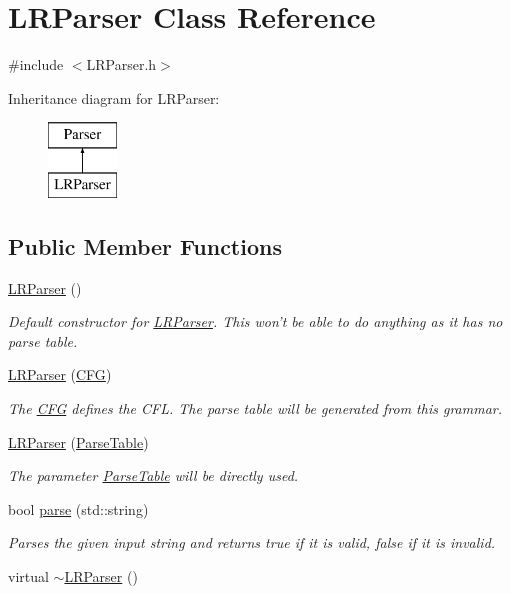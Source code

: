 \hypertarget{classLRParser}{\section{\-L\-R\-Parser \-Class \-Reference}
\label{d6/de9/classLRParser}
}


{\ttfamily \#include $<$\-L\-R\-Parser.\-h$>$}

\-Inheritance diagram for \-L\-R\-Parser\-:\begin{figure}[H]
\begin{center}
\leavevmode
\includegraphics[height=2.000000cm]{d6/de9/classLRParser}
\end{center}
\end{figure}
\subsection*{\-Public \-Member \-Functions}
\begin{DoxyCompactItemize}
\item 
\hyperlink{classLRParser_adf2fe54095f02900d06389007a1e5f53}{\-L\-R\-Parser} ()
\begin{DoxyCompactList}\small\item\em \-Default constructor for \hyperlink{classLRParser}{\-L\-R\-Parser}. \-This won't be able to do anything as it has no parse table. \end{DoxyCompactList}\item 
\hyperlink{classLRParser_abee4e9919e49f66051167487fb467601}{\-L\-R\-Parser} (\hyperlink{classCFG}{\-C\-F\-G})
\begin{DoxyCompactList}\small\item\em \-The \hyperlink{classCFG}{\-C\-F\-G} defines the \-C\-F\-L. \-The parse table will be generated from this grammar. \end{DoxyCompactList}\item 
\hyperlink{classLRParser_a52727298bd32f6b4ac91d2e1351ffe49}{\-L\-R\-Parser} (\hyperlink{classParseTable}{\-Parse\-Table})
\begin{DoxyCompactList}\small\item\em \-The parameter \hyperlink{classParseTable}{\-Parse\-Table} will be directly used. \end{DoxyCompactList}\item 
bool \hyperlink{classLRParser_a0657ab1ec68beb8fce3756f7204079b4}{parse} (std\-::string)
\begin{DoxyCompactList}\small\item\em \-Parses the given input string and returns true if it is valid, false if it is invalid. \end{DoxyCompactList}\item 
virtual \hyperlink{classLRParser_a85b1487a331f1a617ee74965264fcf8f}{$\sim$\-L\-R\-Parser} ()
\end{DoxyCompactItemize}
